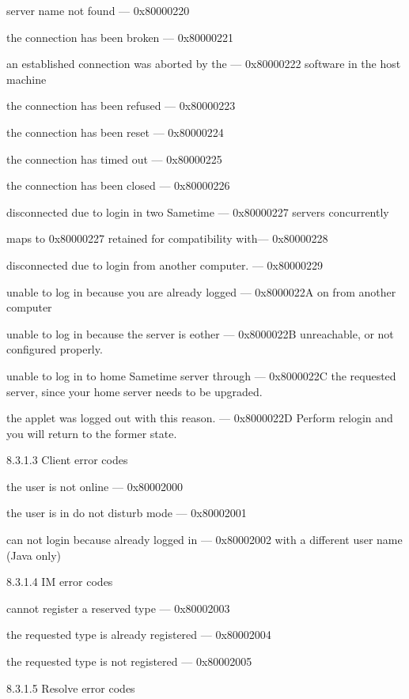 \documentclass[titlepage,oneside]{book}
\begin{document}
server name not found                             --- 0x80000220

the connection has been broken                    --- 0x80000221

an established connection was aborted by the      --- 0x80000222
software in the host machine

the connection has been refused                   --- 0x80000223

the connection has been reset                     --- 0x80000224

the connection has timed out                      --- 0x80000225

the connection has been closed                    --- 0x80000226

disconnected due to login in two Sametime         --- 0x80000227
servers concurrently

maps to 0x80000227 retained for compatibility with--- 0x80000228

disconnected due to login from another computer.  --- 0x80000229

unable to log in because you are already logged   --- 0x8000022A
on from another computer

unable to log in because the server is eother     --- 0x8000022B
unreachable, or not configured properly.

unable to log in to home Sametime server through  --- 0x8000022C
the requested server, since your home server
needs to be upgraded.

the applet was logged out with this reason.       --- 0x8000022D
Perform relogin and you will return to the
former state.

8.3.1.3 Client error codes

the user is not online                            --- 0x80002000

the user is in do not disturb mode                --- 0x80002001

can not login because already logged in           --- 0x80002002
with a different user name (Java only)

8.3.1.4 IM error codes

cannot register a reserved type                   --- 0x80002003

the requested type is already registered          --- 0x80002004

the requested type is not registered              --- 0x80002005

8.3.1.5 Resolve error codes
\end{document}
